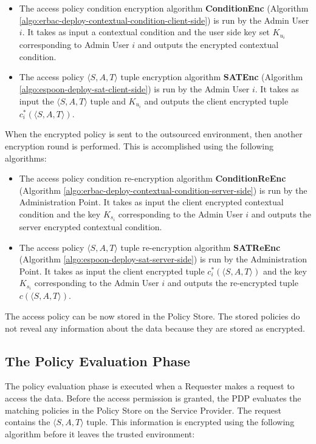 \documentclass[epsfig,a4paper,11pt,titlepage]{book}
\numberwithin{algorithm}{chapter}
\begin{document}
\begin{itemize}

\item The access policy condition encryption algorithm \textbf{ConditionEnc} (Algorithm \ref{algo:erbac-deploy-contextual-condition-client-side}) is run by the Admin User $i$. It takes as input a contextual condition and the user side key set $K_{u_i}$ corresponding to Admin User $i$ and outputs the encrypted contextual condition.

\item The access policy $\langle S, A, T \rangle$ tuple encryption algorithm \textbf{SATEnc} (Algorithm \ref{algo:espoon-deploy-sat-client-side}) is run by the Admin User $i$. It takes as input the $\langle S, A, T \rangle$ tuple and $K_{u_i}$ and outputs the client encrypted tuple $c^*_i (\langle S, A, T \rangle)$.

\end{itemize}

When the encrypted policy is sent to the outsourced environment, then another encryption round is performed. This is accomplished using the following algorithms:

\begin{itemize}

\item The access policy condition re-encryption algorithm \textbf{ConditionReEnc} (Algorithm \ref{algo:erbac-deploy-contextual-condition-server-side}) is run by the Administration Point. It takes as input the client encrypted contextual condition and the key $K_{s_i}$ corresponding to the Admin User $i$ and outputs the server encrypted contextual condition.

\item The access policy $\langle S, A, T \rangle$ tuple re-encryption algorithm \textbf{SATReEnc} (Algorithm \ref{algo:espoon-deploy-sat-server-side}) is run by the Administration Point. It takes as input the client encrypted tuple $c^*_i (\langle S, A, T \rangle)$ and the key $K_{s_i}$ corresponding to the Admin User $i$ and outputs the re-encrypted tuple $c(\langle S, A, T \rangle)$.

\end{itemize}

The access policy can be now stored in the Policy Store. The stored policies do not reveal any information about the data because they are stored as encrypted.

\subsection{The Policy Evaluation Phase}
The policy evaluation phase is executed when a Requester makes a request to access the data. Before the access permission is granted, the \gls{PDP} evaluates the matching policies in the Policy Store on the Service Provider. The request contains the $\langle S, A, T \rangle$ tuple. This information is encrypted using the following algorithm before it leaves the trusted environment:
\end{document}
